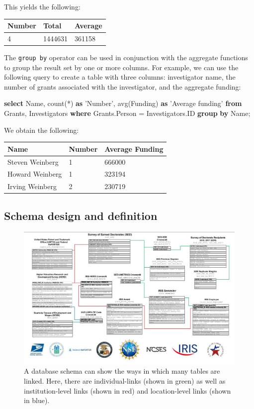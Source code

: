 \documentclass[]{krantz}
\newenvironment{Shaded}{\begin{snugshade}}{\end{snugshade}}
\newcommand{\KeywordTok}[1]{\textcolor[rgb]{0.13,0.29,0.53}{\textbf{#1}}}
\newcommand{\StringTok}[1]{\textcolor[rgb]{0.31,0.60,0.02}{#1}}
\newcommand{\FunctionTok}[1]{\textcolor[rgb]{0.00,0.00,0.00}{#1}}
\newcommand{\NormalTok}[1]{#1}
\begin{document}
This yields the following:

\begin{longtable}[]{@{}lll@{}}
\toprule
\textbf{Number} & \textbf{Total} & \textbf{Average}\tabularnewline
\midrule
\endhead
4 & 1444631 & 361158\tabularnewline
\bottomrule
\end{longtable}

The \texttt{group\ by} operator can be used in conjunction with the
aggregate functions to group the result set by one or more columns. For
example, we can use the following query to create a table with three
columns: investigator name, the number of grants associated with the
investigator, and the aggregate funding:

\begin{Shaded}
\begin{Highlighting}[]
\KeywordTok{select}\NormalTok{ Name, }\FunctionTok{count}\NormalTok{(*) }\KeywordTok{as} \StringTok{'Number'}\NormalTok{,}
       \FunctionTok{avg}\NormalTok{(Funding) }\KeywordTok{as} \StringTok{'Average funding'}
\KeywordTok{from}\NormalTok{ Grants, Investigators}
\KeywordTok{where}\NormalTok{ Grants.Person = Investigators.ID}
\KeywordTok{group} \KeywordTok{by}\NormalTok{ Name;}
\end{Highlighting}
\end{Shaded}

We obtain the following:

\begin{longtable}[]{@{}lll@{}}
\toprule
\textbf{Name} & \textbf{Number} & \textbf{Average
Funding}\tabularnewline
\midrule
\endhead
Steven Weinberg & 1 & 666000\tabularnewline
Howard Weinberg & 1 & 323194\tabularnewline
Irving Weinberg & 2 & 230719\tabularnewline
\bottomrule
\end{longtable}

\hypertarget{sec:db:schema}{\subsection{Schema design and
definition}\label{sec:db:schema}}

\begin{figure}

{\centering \includegraphics[width=0.7\linewidth]{ChapterDB/figures/NCSES-Database-Diagram} 

}

\caption{A database schema can show the ways in which many tables are linked. Here, there are individual-links (shown in green) as well as institution-level links (shown in red) and location-level links (shown in blue).}\label{fig:NCSES}
\end{figure}
\end{document}
